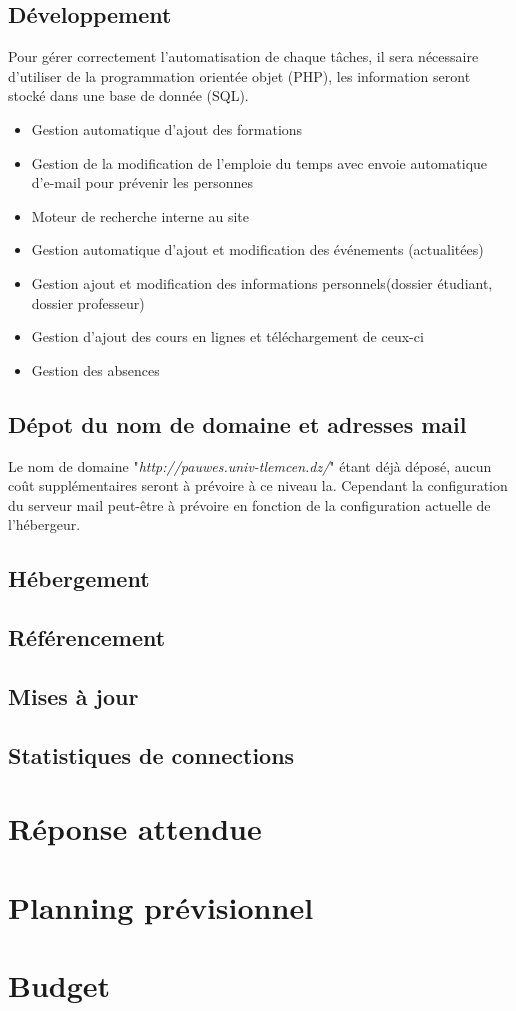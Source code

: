 \documentclass[oneside]{report}
\begin{document}
{		\section{Développement}
		\par Pour gérer correctement l’automatisation de chaque tâches, il sera nécessaire d’utiliser de la programmation orientée objet (PHP), les information seront stocké dans une base de donnée (SQL).
		\par
		\begin{itemize}
			\item Gestion automatique d’ajout des formations
			\item Gestion de la modification de l’emploie du temps avec envoie automatique d'e-mail pour prévenir les personnes
			\item Moteur de recherche interne au site
			\item Gestion automatique d’ajout et modification des événements (actualitées)
			\item Gestion ajout et modification des informations personnels(dossier étudiant, dossier professeur)
			\item Gestion d’ajout des cours en lignes et téléchargement de ceux-ci
			\item Gestion des absences
		\end{itemize}
		\section{Dépot du nom de domaine et adresses mail}
		{
			\par Le nom de domaine "\textit{http://pauwes.univ-tlemcen.dz/}" étant déjà déposé, aucun coût supplémentaires seront à prévoire à ce niveau la. Cependant la configuration du serveur mail peut-être à prévoire en fonction de la configuration actuelle de l'hébergeur.
		}
		\section{Hébergement}
		\section{Référencement}
		\section{Mises à jour}
		\section{Statistiques de connections}
	}

	\chapter{Réponse attendue}
	{
	
	}

	\chapter{Planning prévisionnel}
	{
	
	}

	\chapter{Budget}
	{
		
	}
\end{document}
